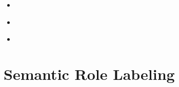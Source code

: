 
\begin{itemize}
    \item [***] \textcite[Introduction]{cranmerWhatCanWe2017}
    \item \textcite[Chapter 1]{cranmerWhatCanWe2017}
    \item \textcite[Chapter 2]{cranmerWhatCanWe2017}
\end{itemize}


\section{Semantic Role Labeling}



